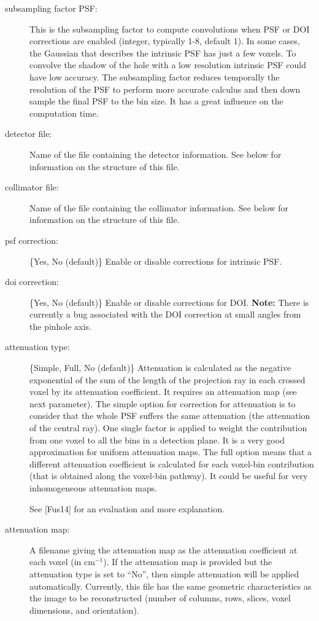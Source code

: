 \documentclass{article}
\begin{document}
{{\begin{description}
\item[subsampling factor PSF:] This is the subsampling factor to compute convolutions when PSF or DOI corrections are enabled (integer, typically 1-8, default 1). In some cases, the Gaussian that describes the intrinsic PSF has just a few voxels. To convolve the shadow of the hole with a low resolution intrinsic PSF could have low accuracy. The subsampling factor reduces temporally the resolution of the PSF to perform more accurate calculus and then down sample the final PSF to the bin size. It has a great influence on the computation time.

\item[detector file:] Name of the file containing the detector information. See below for information on the structure of this file.

\item[collimator file:] Name of the file containing the collimator information. See below for information on the structure of this file.

\item[psf correction:] \{Yes, No (default)\} Enable or disable corrections for intrinsic PSF.

\item[doi correction:] \{Yes, No (default)\} Enable or disable corrections for DOI. \textbf{Note:} There is currently a bug associated with the DOI correction at small angles from the pinhole axis.

\item[attenuation type:] \{Simple, Full, No (default)\} Attenuation is calculated as the negative exponential of the sum of the length of the projection ray in each crossed voxel by its attenuation coefficient. It requires an attenuation map (see next parameter). The simple option for correction for attenuation is to consider that the whole PSF suffers the same attenuation (the attenuation of the central ray). One single factor is applied to weight the contribution from one voxel to all the bins in a detection plane. It is a very good approximation for uniform attenuation maps. The full option means that a different attenuation coefficient is calculated for each voxel-bin contribution (that is obtained along the voxel-bin pathway). It could be useful for very inhomogeneous attenuation maps.

See [Fus14] for an evaluation and more explanation.

\item[attenuation map:] A filename giving the attenuation map as the attenuation coefficient at each voxel (in $\mathrm{cm}^{-1}$). If the attenuation map is provided but the attenuation type is set to ``No'', then simple attenuation will be applied automatically. Currently, this file has the same geometric characteristics as the image to be reconstructed (number of columns, rows, slices, voxel dimensions, and orientation).


\end{description}}}
\end{document}
